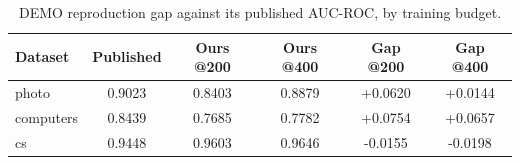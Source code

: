 \begin{table}[t]
\centering
\small
\begin{tabular}{lccccc}
\toprule
Dataset & Published & Ours @200 & Ours @400 & Gap @200 & Gap @400 \\
\midrule
photo & 0.9023 & 0.8403 & 0.8879 & +0.0620 & +0.0144 \\
computers & 0.8439 & 0.7685 & 0.7782 & +0.0754 & +0.0657 \\
cs & 0.9448 & 0.9603 & 0.9646 & -0.0155 & -0.0198 \\
\bottomrule
\end{tabular}
\caption{DEMO reproduction gap against its published AUC-ROC, by training budget.}
\label{tab:demo_gap}
\end{table}
